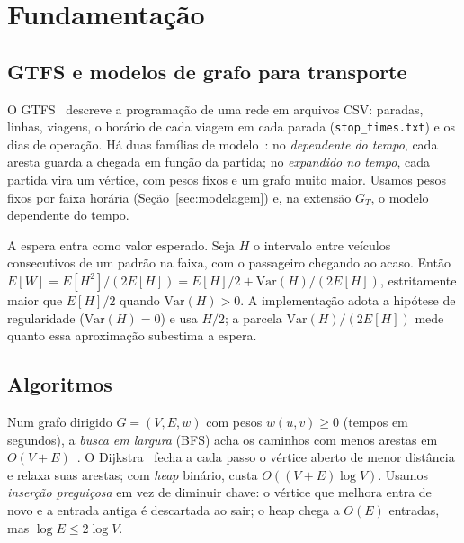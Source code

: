 \section{Fundamentação}\label{sec:fund}

\subsection{GTFS e modelos de grafo para transporte}

O GTFS~\cite{gtfs-reference} descreve a programação de uma rede em arquivos CSV: paradas,
linhas, viagens, o horário de cada viagem em cada parada (\texttt{stop\_times.txt}) e os
dias de operação. Há duas famílias de modelo~\cite{pyrga2008}: no \emph{dependente do tempo},
cada aresta guarda a chegada em função da partida; no \emph{expandido no tempo}, cada partida
vira um vértice, com pesos fixos e um grafo muito maior. Usamos pesos fixos por faixa horária
(Seção~\ref{sec:modelagem}) e, na extensão $G_T$, o modelo dependente do tempo.

A espera entra como valor esperado. Seja $H$ o intervalo entre veículos consecutivos de um
padrão na faixa, com o passageiro chegando ao acaso. Então~\cite[seção~2.2]{chen2012}
$E[W] = E[H^2]/(2E[H]) = E[H]/2 + \mathrm{Var}(H)/(2E[H])$, estritamente maior que $E[H]/2$
quando $\mathrm{Var}(H) > 0$. A implementação adota a hipótese de regularidade
($\mathrm{Var}(H) = 0$) e usa $H/2$; a parcela $\mathrm{Var}(H)/(2E[H])$ mede quanto essa
aproximação subestima a espera.

\subsection{Algoritmos}

Num grafo dirigido $G = (V, E, w)$ com pesos $w(u, v) \ge 0$ (tempos em segundos), a
\emph{busca em largura} (BFS) acha os caminhos com menos arestas em $O(V + E)$~\cite{cormen2009}.
O Dijkstra~\cite{dijkstra1959} fecha a cada passo o vértice aberto de menor distância e relaxa
suas arestas; com \emph{heap} binário, custa $O((V + E)\log V)$. Usamos \emph{inserção
preguiçosa} em vez de diminuir chave: o vértice que melhora entra de novo e a entrada antiga é
descartada ao sair; o heap chega a $O(E)$ entradas, mas $\log E \le 2\log V$.

